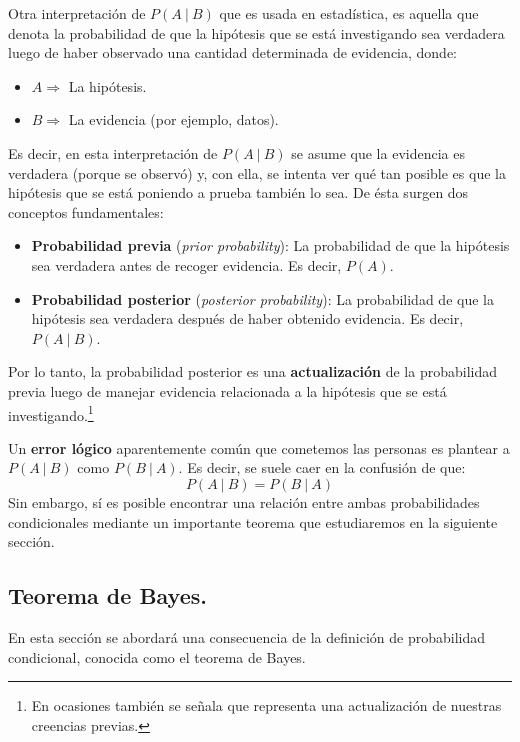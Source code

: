 \documentclass[12pt]{article}
\begin{document}
Otra interpretación de $P(A \ | \ B)$ que es usada en estadística, es aquella que denota la probabilidad de que la hipótesis que se está investigando sea verdadera luego de haber observado una cantidad determinada de evidencia, donde:

\begin{itemize}
\item $A \Longrightarrow$ La hipótesis.
\item $B \Longrightarrow$ La evidencia (por ejemplo, datos).
\end{itemize}

Es decir, en esta interpretación de $P(A \ | \ B)$ se asume que la evidencia es verdadera (porque se observó) y, con ella, se intenta ver qué tan posible es que la hipótesis que se está poniendo a prueba también lo sea. De ésta surgen dos conceptos fundamentales:

\begin{itemize}
\item \textbf{Probabilidad previa} (\textit{prior probability}): La probabilidad de que la hipótesis sea verdadera antes de recoger evidencia. Es decir, $P(A)$.
\item \textbf{Probabilidad posterior} (\textit{posterior probability}): La probabilidad de que la hipótesis sea verdadera después de haber obtenido evidencia. Es decir, $P(A \ | \ B)$.
\end{itemize}

Por lo tanto, la probabilidad posterior es una \textbf{actualización} de la probabilidad previa luego de manejar evidencia relacionada a la hipótesis que se está investigando.\footnote{En ocasiones también se señala que representa una actualización de nuestras creencias previas.}

Un \textbf{error lógico} aparentemente común que cometemos las personas es plantear a $P(A \ | \ B)$ como $P(B \ | \ A)$. Es decir, se suele caer en la confusión de que:
\[
  P(A \ | \ B) = P(B \ | \ A)
\]
Sin embargo, sí es posible encontrar una relación entre ambas probabilidades condicionales mediante un importante teorema que estudiaremos en la siguiente sección.

\subsection{Teorema de Bayes.}

En esta sección se abordará una consecuencia de la definición de probabilidad condicional, conocida como el teorema de Bayes.
\end{document}
